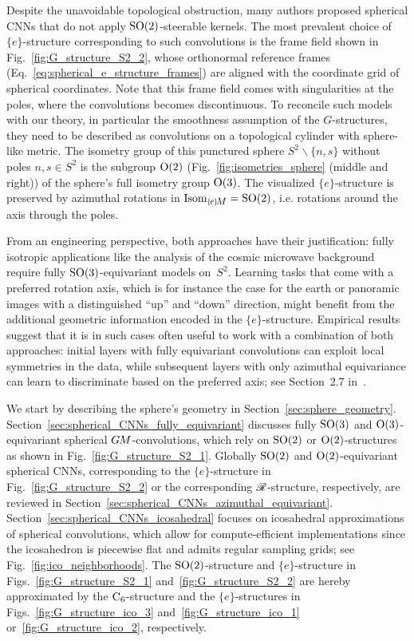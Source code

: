 Despite the unavoidable topological obstruction, many authors proposed spherical CNNs that do not apply $\operatorname{SO}(2)$-steerable kernels.
The most prevalent choice of $\{e\}$-structure corresponding to such convolutions is the frame field shown in Fig.~\ref{fig:G_structure_S2_2}, whose orthonormal reference frames (Eq.~\eqref{eq:spherical_e_structure_frames}) are aligned with the coordinate grid of spherical coordinates.
Note that this frame field comes with singularities at the poles, where the convolutions becomes discontinuous.
To reconcile such models with our theory, in particular the smoothness assumption of the $G$-structures, they need to be described as convolutions on a topological cylinder with sphere-like metric.
The isometry group of this punctured sphere $S^2 \backslash \{n,s\}$ without poles $n,s \in S^2$ is the subgroup $\operatorname{O}(2)$ (Fig.~\ref{fig:isometries_sphere} (middle and right)) of the sphere's full isometry group $\operatorname{O}(3)$.
The visualized $\{e\}$-structure is preserved by azimuthal rotations in $\IsomeM = \SO2$, i.e. rotations around the axis through the poles.

From an engineering perspective, both approaches have their justification:
fully isotropic applications like the analysis of the cosmic microwave background require fully $\operatorname{SO}(3)$-equivariant models on~$S^2$.
Learning tasks that come with a preferred rotation axis, which is for instance the case for the earth or panoramic images with a distinguished ``up'' and ``down'' direction, might benefit from the additional geometric information encoded in the $\{e\}$-structure.
Empirical results suggest that it is in such cases often useful to work with a combination of both approaches:
initial layers with fully equivariant convolutions can exploit local symmetries in the data, while subsequent layers with only azimuthal equivariance can learn to discriminate based on the preferred axis; see Section~2.7 in~\cite{3d_steerableCNNs}.


\etocsettocstyle{}{} %
\localtableofcontents


We start by describing the sphere's geometry in Section~\ref{sec:sphere_geometry}.
Section~\ref{sec:spherical_CNNs_fully_equivariant} discusses fully $\operatorname{SO}(3)$ and $\operatorname{O}(3)$-equivariant spherical $G\mkern-1.4muM$-convolutions, which rely on $\operatorname{SO}(2)$ or $\operatorname{O}(2)$-structures as shown in Fig.~\ref{fig:G_structure_S2_1}.
Globally $\operatorname{SO}(2)$ and $\operatorname{O}(2)$-equivariant spherical CNNs, corresponding to the $\{e\}$-structure in Fig.~\ref{fig:G_structure_S2_2} or the corresponding $\mathscr{R}$-structure, respectively, are reviewed in Section~\ref{sec:spherical_CNNs_azimuthal_equivariant}.
Section~\ref{sec:spherical_CNNs_icosahedral} focuses on icosahedral approximations of spherical convolutions, which allow for compute-efficient implementations since the icosahedron is piecewise flat and admits regular sampling grids; see Fig.~\ref{fig:ico_neighborhoods}.
The $\operatorname{SO}(2)$-structure and $\{e\}$-structure in Figs.~\ref{fig:G_structure_S2_1} and~\ref{fig:G_structure_S2_2} are hereby approximated by the $\operatorname{C}_{6}$-structure and the $\{e\}$-structures in Figs.~\ref{fig:G_structure_ico_3} and~\ref{fig:G_structure_ico_1} or~\ref{fig:G_structure_ico_2}, respectively.

